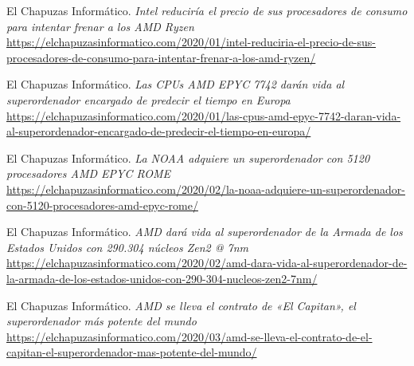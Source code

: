 \documentclass[11pt,a4paper]{article}
\begin{document}
\begin{thebibliography}{20}
El Chapuzas Informático. \textit{Intel reduciría el precio de sus procesadores de consumo para intentar frenar a los AMD Ryzen}
\\\url{https://elchapuzasinformatico.com/2020/01/intel-reduciria-el-precio-de-sus-procesadores-de-consumo-para-intentar-frenar-a-los-amd-ryzen/}

El Chapuzas Informático. \textit{Las CPUs AMD EPYC 7742 darán vida al superordenador encargado de predecir el tiempo en Europa}
\\\url{https://elchapuzasinformatico.com/2020/01/las-cpus-amd-epyc-7742-daran-vida-al-superordenador-encargado-de-predecir-el-tiempo-en-europa/}

El Chapuzas Informático. \textit{La NOAA adquiere un superordenador con 5120 procesadores AMD EPYC ROME}
\\\url{https://elchapuzasinformatico.com/2020/02/la-noaa-adquiere-un-superordenador-con-5120-procesadores-amd-epyc-rome/}

El Chapuzas Informático. \textit{AMD dará vida al superordenador de la Armada de los Estados Unidos con 290.304 núcleos Zen2 @ 7nm}
\\\url{https://elchapuzasinformatico.com/2020/02/amd-dara-vida-al-superordenador-de-la-armada-de-los-estados-unidos-con-290-304-nucleos-zen2-7nm/}

El Chapuzas Informático. \textit{AMD se lleva el contrato de «El Capitan», el superordenador más potente del mundo}
\\\url{https://elchapuzasinformatico.com/2020/03/amd-se-lleva-el-contrato-de-el-capitan-el-superordenador-mas-potente-del-mundo/}

\end{thebibliography}
\end{document}
